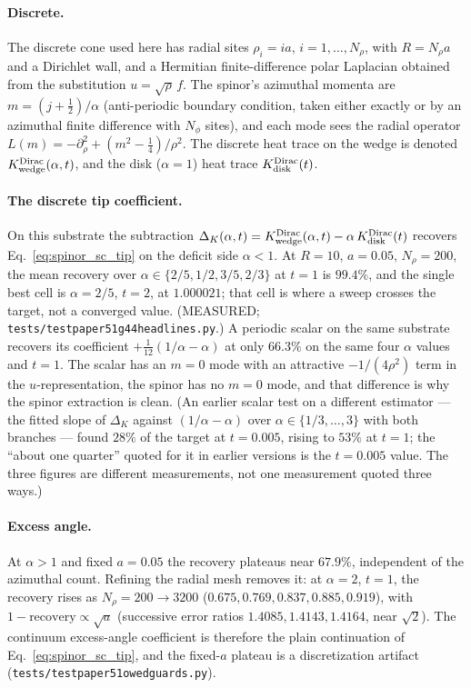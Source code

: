 \documentclass[11pt,a4paper]{article}
\theoremstyle{plain}
\theoremstyle{definition}
\renewcommand{\_}{\textunderscore\allowbreak}
\begin{document}
\paragraph{Discrete.} The discrete cone used here has radial sites
$\rho_i = ia$, $i = 1, \dots, N_\rho$, with $R = N_\rho a$ and a Dirichlet
wall, and a Hermitian finite-difference polar Laplacian obtained from
the substitution $u = \sqrt{\rho}\, f$. The spinor's azimuthal momenta
are $m = (j + \tfrac12)/\alpha$ (anti-periodic boundary condition, taken
either exactly or by an azimuthal finite difference with $N_\phi$ sites),
and each mode sees the radial operator
$L(m) = -\partial_\rho^2 + (m^2 - \tfrac14)/\rho^2$. The discrete heat
trace on the wedge is denoted $K^{\rm Dirac}_{\rm wedge}(\alpha, t)$, and
the disk ($\alpha = 1$) heat trace $K^{\rm Dirac}_{\rm disk}(t)$.

\paragraph{The discrete tip coefficient.} On this substrate the
subtraction
$\Delta_K(\alpha, t) = K^{\rm Dirac}_{\rm wedge}(\alpha, t) - \alpha\,
K^{\rm Dirac}_{\rm disk}(t)$ recovers Eq.~\eqref{eq:spinor_sc_tip} on the
deficit side $\alpha < 1$. At $R = 10$, $a = 0.05$, $N_\rho = 200$, the
mean recovery over $\alpha \in \{2/5, 1/2, 3/5, 2/3\}$ at $t = 1$ is
$99.4\%$, and the single best cell is $\alpha = 2/5$, $t = 2$, at
$1.000021$; that cell is where a sweep crosses the target, not a converged
value. (MEASURED;
\texttt{tests/test\_paper51\_g44\_headlines.py}.) A periodic scalar on
the same substrate recovers its coefficient
$+\tfrac{1}{12}(1/\alpha - \alpha)$ at only $66.3\%$ on the same four
$\alpha$ values and $t = 1$. The scalar has an $m = 0$ mode with an
attractive $-1/(4\rho^2)$ term in the $u$-representation, the spinor
has no $m = 0$ mode, and that difference is why the spinor extraction is
clean. (An earlier scalar test on a different estimator --- the fitted
slope of $\Delta_K$ against $(1/\alpha - \alpha)$ over
$\alpha \in \{1/3, \dots, 3\}$ with both branches --- found $28\%$ of the
target at $t = 0.005$, rising to $53\%$ at $t = 1$; the ``about one
quarter'' quoted for it in earlier versions is the $t = 0.005$ value. The
three figures are different measurements, not one measurement quoted
three ways.)

\paragraph{Excess angle.} At $\alpha > 1$ and fixed $a = 0.05$ the
recovery plateaus near $67.9\%$, independent of the azimuthal count.
Refining the radial mesh removes it: at $\alpha = 2$, $t = 1$, the
recovery rises as $N_\rho = 200 \to 3200$ ($0.675, 0.769, 0.837, 0.885,
0.919$), with $1 - \text{recovery} \propto \sqrt{a}$ (successive error
ratios $1.4085, 1.4143, 1.4164$, near $\sqrt{2}$). The continuum
excess-angle coefficient is therefore the plain continuation of
Eq.~\eqref{eq:spinor_sc_tip}, and the fixed-$a$ plateau is a
discretization artifact (\texttt{tests/test\_paper51\_owed\_guards.py}).
\end{document}
